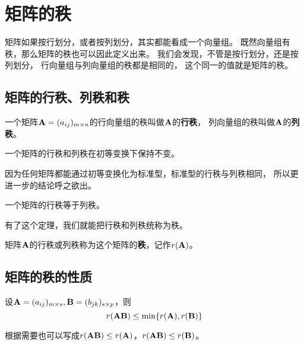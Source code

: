 \section{矩阵的秩}
矩阵如果按行划分，或者按列划分，其实都能看成一个向量组。
既然向量组有秩，那么矩阵的秩也可以因此定义出来。
我们会发现，不管是按行划分，还是按列划分，
行向量组与列向量组的秩都是相同的，
这个同一的值就是矩阵的秩。

\subsection{矩阵的行秩、列秩和秩}
\begin{definition}[行秩与列秩]
  一个矩阵$\mathbf{A}=(a_{ij})_{m\times n}$的行向量组的秩叫做$\mathbf{A}$的\textbf{行秩}，
  列向量组的秩叫做$\mathbf{A}$的\textbf{列秩}。
\end{definition}

\begin{theorem}[行秩与列秩的不变性]
  一个矩阵的行秩和列秩在初等变换下保持不变。
\end{theorem}

\begin{remark}
  因为任何矩阵都能通过初等变换化为标准型，标准型的行秩与列秩相同，
  所以更进一步的结论呼之欲出。
\end{remark}

\begin{theorem}[行秩与列秩相等]
  一个矩阵的行秩等于列秩。
\end{theorem}

\begin{remark}
  有了这个定理，我们就能把行秩和列秩统称为秩。
\end{remark}

\begin{theorem}[秩]
  矩阵$\mathbf{A}$的行秩或列秩称为这个矩阵的\textbf{秩}，记作$r(\mathbf{A})$。
\end{theorem}

\subsection{矩阵的秩的性质}
\begin{theorem}
  设$\mathbf{A}=(a_{ij})_{m\times s}, \mathbf{B}=(b_{jk})_{s\times p}$，则
  \[ r(\mathbf{A}\mathbf{B}) \le \min\{ r(\mathbf{A}), r(\mathbf{B}) \} \]
\end{theorem}

\begin{remark}
  根据需要也可以写成$r(\mathbf{A}\mathbf{B}) \le r(\mathbf{A})$，$r(\mathbf{A}\mathbf{B})\le r(\mathbf{B})$。
\end{remark}


